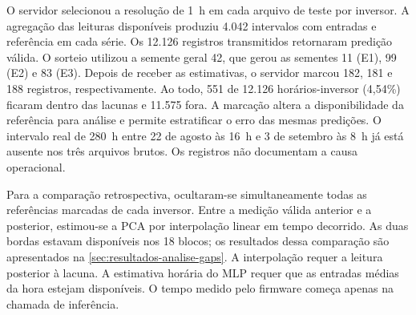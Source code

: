 O servidor selecionou a resolução de 1~h em cada arquivo de teste por
inversor. A agregação das leituras disponíveis produziu 4.042 intervalos com
entradas e referência em cada série. Os 12.126 registros transmitidos
retornaram predição válida. O sorteio utilizou a semente geral 42, que gerou
as sementes 11 (E1), 99 (E2) e 83 (E3). Depois de receber as estimativas, o
servidor marcou 182, 181 e 188 registros, respectivamente. Ao todo, 551 de
12.126 horários-inversor (4,54\%) ficaram dentro das lacunas e 11.575 fora.
A marcação altera a disponibilidade da referência para análise e permite
estratificar o erro das mesmas predições. O intervalo real de 280~h entre 22
de agosto às 16~h e 3 de setembro às 8~h já está ausente nos três arquivos
brutos. Os registros não documentam a causa operacional.

Para a comparação retrospectiva, ocultaram-se simultaneamente todas as
referências marcadas de cada inversor. Entre a medição válida anterior e a
posterior, estimou-se a PCA por interpolação linear em tempo decorrido. As
duas bordas estavam disponíveis nos 18 blocos; os resultados dessa comparação
são apresentados na \cref{sec:resultados-analise-gaps}. A interpolação requer
a leitura posterior à lacuna. A estimativa horária do MLP requer que as
entradas médias da hora estejam disponíveis. O tempo medido pelo firmware
começa apenas na chamada de inferência.

